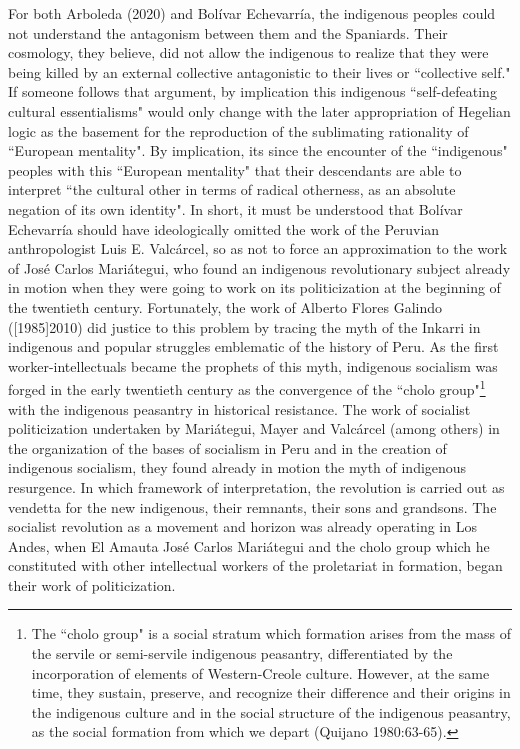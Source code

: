 \documentclass[]{interact}
\theoremstyle{plain}%
\theoremstyle{definition}
\theoremstyle{remark}
\begin{document}
For both Arboleda (2020) and Bolívar Echevarría, the indigenous peoples could not understand the antagonism between them and the Spaniards. Their cosmology, they believe, did not allow the indigenous to realize that they were being killed by an external collective antagonistic to their lives or “collective self." If someone follows that argument, by implication this indigenous “self-defeating cultural essentialisms" would only change with the later appropriation of Hegelian logic as the basement for the reproduction of the sublimating rationality of “European mentality". By implication, its since the encounter of the “indigenous" peoples with this “European mentality" that their descendants are able to interpret “the cultural other in terms of radical otherness, as an absolute negation of its own identity". In short, it must be understood that Bolívar Echevarría should have ideologically omitted the work of the Peruvian anthropologist Luis E. Valcárcel, so as not to force an approximation to the work of José Carlos Mariátegui, who found an indigenous revolutionary subject already in motion when they were going to work on its politicization at the beginning of the twentieth century. Fortunately, the work of Alberto Flores Galindo ([1985]2010) did justice to this problem by tracing the myth of the Inkarri in indigenous and popular struggles emblematic of the history of Peru.
As the first worker-intellectuals became the prophets of this myth, indigenous socialism was forged in the early twentieth century as the convergence of the “cholo group"\footnote{The “cholo group" is a social stratum which formation arises from the mass of the servile or semi-servile indigenous peasantry, differentiated by the incorporation of elements of Western-Creole culture. However, at the same time, they sustain, preserve, and recognize their difference and their origins in the indigenous culture and in the social structure of the indigenous peasantry, as the social formation from which we depart (Quijano 1980:63-65).} with the indigenous peasantry in historical resistance. The work of socialist politicization undertaken by Mariátegui, Mayer and Valcárcel (among others) in the organization of the bases of socialism in Peru and in the creation of indigenous socialism, they found already in motion the myth of indigenous resurgence. In which framework of interpretation, the revolution is carried out as vendetta for the new indigenous, their remnants, their sons and grandsons. The socialist revolution as a movement and horizon was already operating in Los Andes, when El Amauta José Carlos Mariátegui and the cholo group which he constituted with other intellectual workers of the proletariat in formation, began their work of politicization.
\end{document}
